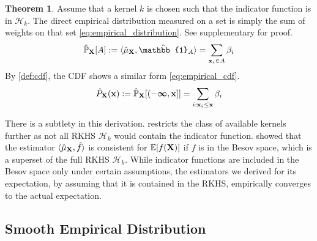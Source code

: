 \documentclass[twoside]{article} \usepackage{aistats2017}
\theoremstyle{definition}
\theoremstyle{theorem}
\newtheorem{theorem}{Theorem}[section]
\newcommand{\rv}[1]{{#1}}
\newcommand{\inner}[2]{{\langle #1, #2 \rangle}}
\begin{document}
		\begin{theorem} \label{thm:empirical_distribution_and_cdf}
			Assume that a kernel $k$ is chosen such that the indicator function is in $\mathcal{H}_{k}$. The direct empirical distribution measured on a set is simply the sum of weights on that set \eqref{eq:empirical_distribution}. See supplementary for proof.
			\begin{equation}
				\hat{\mathbb{P}}_{\bvec{\rv{X}}}[A] := \inner{\hat{\mu}_{\bvec{\rv{X}}}}{ \hat{\mathbb{1}}_{A}} = \sum_{\bvec{x}_{i} \in A} \beta_{i}
			\label{eq:empirical_distribution}
			\end{equation}
			By \cref{def:cdf}, the CDF shows a similar form \eqref{eq:empirical_cdf}.
			\begin{equation}
				\hat{P}_{\bvec{\rv{X}}}(\bvec{x}) := \hat{\mathbb{P}}_{\bvec{\rv{X}}}[(-\bm{\infty}, \bvec{x}]] = \sum_{i : \bvec{x}_{i} \leq \bvec{x}} \beta_{i}
			\label{eq:empirical_cdf}
			\end{equation}
		\end{theorem}

		There is a subtlety in this derivation.  restricts the class of available kernels further as not all RKHS $\mathcal{H}_{k}$ would contain the indicator function. \cite{kanagawa2014recovering} showed that the estimator $\langle \hat{\mu}_{\bvec{\rv{X}}}, \hat{f} \rangle$ is consistent for $\mathbb{E}[f(\bvec{\rv{X}})]$ if $f$ is in the Besov space, which is a superset of the full RKHS $\mathcal{H}_{k}$. While indicator functions are included in the Besov space only under certain assumptions, the estimators we derived for its expectation, by assuming that it is contained in the RKHS, empirically converges to the actual expectation.

	\subsection{Smooth Empirical Distribution}
	\label{sec:direct_quantile_regression:smooth_empirical_distribution}
\end{document}
